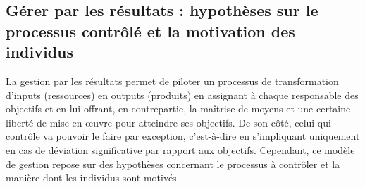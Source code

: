 \documentclass{kaobook}
\begin{document}
\subsection{Gérer par les résultats : hypothèses sur le processus contrôlé et la motivation des individus}
\label{sec:org3219d8d}
La gestion par les résultats permet de piloter un processus de transformation d’inputs (ressources) en outputs (produits) en assignant à chaque responsable des objectifs et en lui offrant, en contrepartie, la maîtrise de moyens et une certaine liberté de mise en œuvre pour atteindre ses objectifs. De son côté, celui qui contrôle va pouvoir le faire par exception, c’est-à-dire en s’impliquant uniquement en cas de déviation significative par rapport aux objectifs. Cependant, ce modèle de gestion repose sur des hypothèses concernant le processus à contrôler et la manière dont les individus sont motivés.\\
\end{document}
